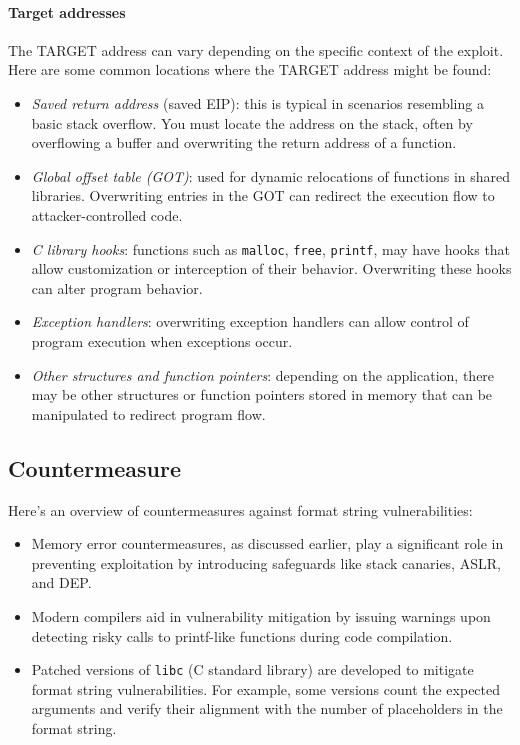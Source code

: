 \paragraph*{Target addresses}
The TARGET address can vary depending on the specific context of the exploit. 
Here are some common locations where the TARGET address might be found:
\begin{itemize}
    \item \textit{Saved return address} (saved EIP): this is typical in scenarios resembling a basic stack overflow.
        You must locate the address on the stack, often by overflowing a buffer and overwriting the return address of a function.
    \item \textit{Global offset table (GOT)}: used for dynamic relocations of functions in shared libraries.
        Overwriting entries in the GOT can redirect the execution flow to attacker-controlled code.
    \item \textit{C library hooks}: functions such as \texttt{malloc}, \texttt{free}, \texttt{printf}, may have hooks that allow customization or interception of their behavior.
        Overwriting these hooks can alter program behavior.
    \item \textit{Exception handlers}: overwriting exception handlers can allow control of program execution when exceptions occur.
    \item \textit{Other structures and function pointers}: depending on the application, there may be other structures or function pointers stored in memory that can be manipulated to redirect program flow.
\end{itemize}

\subsection{Countermeasure}
Here's an overview of countermeasures against format string vulnerabilities:
\begin{itemize}
    \item Memory error countermeasures, as discussed earlier, play a significant role in preventing exploitation by introducing safeguards like stack canaries, ASLR, and DEP.
    \item Modern compilers aid in vulnerability mitigation by issuing warnings upon detecting risky calls to printf-like functions during code compilation.
    \item Patched versions of \texttt{libc} (C standard library) are developed to mitigate format string vulnerabilities. 
        For example, some versions count the expected arguments and verify their alignment with the number of placeholders in the format string.
\end{itemize}

